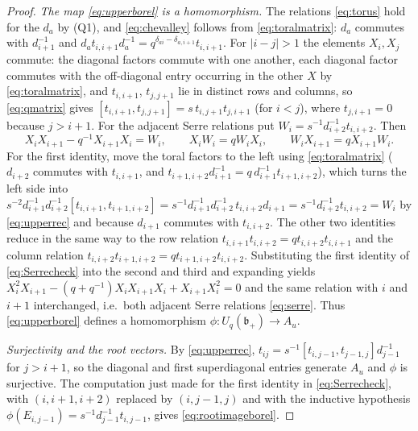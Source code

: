 \documentclass[11pt]{article}
\theoremstyle{remark}
\newcommand{\U}{U_q}
\newcommand{\bp}{\mathfrak b_+}
\begin{document}
\begin{proof}
\emph{The map \eqref{eq:upperborel} is a homomorphism.} The relations
\eqref{eq:torus} hold for the $d_a$ by (Q1), and \eqref{eq:chevalley}
follows from \eqref{eq:toralmatrix}: $d_a$ commutes with $d_{i+1}^{-1}$
and $d_at_{i,i+1}d_a^{-1}=q^{\delta_{ai}-\delta_{a,i+1}}t_{i,i+1}$.
For $|i-j|>1$ the elements $X_i,X_j$ commute: the diagonal factors
commute with one another, each diagonal factor commutes with the
off-diagonal entry occurring in the other $X$ by \eqref{eq:toralmatrix},
and $t_{i,i+1}$, $t_{j,j+1}$ lie in distinct rows and columns, so
\eqref{eq:qmatrix} gives $[t_{i,i+1},t_{j,j+1}]=s\,t_{i,j+1}t_{j,i+1}$
(for $i<j$), where $t_{j,i+1}=0$ because $j>i+1$. For the adjacent
Serre relations put $W_i=s^{-1}d_{i+2}^{-1}t_{i,i+2}$. Then
\begin{equation}\label{eq:Serrecheck}
 X_iX_{i+1}-q^{-1}X_{i+1}X_i=W_i,\qquad
 X_iW_i=qW_iX_i,\qquad W_iX_{i+1}=qX_{i+1}W_i.
\end{equation}
For the first identity, move the toral factors to the left using
\eqref{eq:toralmatrix} ($d_{i+2}$ commutes with $t_{i,i+1}$, and
$t_{i+1,i+2}d_{i+1}^{-1}=q\,d_{i+1}^{-1}t_{i+1,i+2}$), which turns the
left side into
$s^{-2}d_{i+1}^{-1}d_{i+2}^{-1}[t_{i,i+1},t_{i+1,i+2}]
 =s^{-1}d_{i+1}^{-1}d_{i+2}^{-1}\,t_{i,i+2}d_{i+1}
 =s^{-1}d_{i+2}^{-1}t_{i,i+2}=W_i$
by \eqref{eq:upperrec} and because $d_{i+1}$ commutes with
$t_{i,i+2}$. The other two identities reduce in the same way to the row
relation $t_{i,i+1}t_{i,i+2}=qt_{i,i+2}t_{i,i+1}$ and the column
relation $t_{i,i+2}t_{i+1,i+2}=qt_{i+1,i+2}t_{i,i+2}$. Substituting the
first identity of \eqref{eq:Serrecheck} into the second and third and
expanding yields
$X_i^2X_{i+1}-(q+q^{-1})X_iX_{i+1}X_i+X_{i+1}X_i^2=0$
and the same relation with $i$ and $i+1$ interchanged, i.e.\ both
adjacent Serre relations \eqref{eq:serre}. Thus \eqref{eq:upperborel}
defines a homomorphism $\phi:\U(\bp)\to A_u$.

\emph{Surjectivity and the root vectors.} By \eqref{eq:upperrec},
$t_{ij}=s^{-1}[t_{i,j-1},t_{j-1,j}]d_{j-1}^{-1}$ for $j>i+1$, so the
diagonal and first superdiagonal entries generate $A_u$ and $\phi$ is
surjective. The computation just made for the first identity in
\eqref{eq:Serrecheck}, with $(i,i+1,i+2)$ replaced by $(i,j-1,j)$ and
with the inductive hypothesis $\phi(E_{i,j-1})=s^{-1}d_{j-1}^{-1}t_{i,j-1}$,
gives \eqref{eq:rootimageborel}.


\end{proof}
\end{document}
